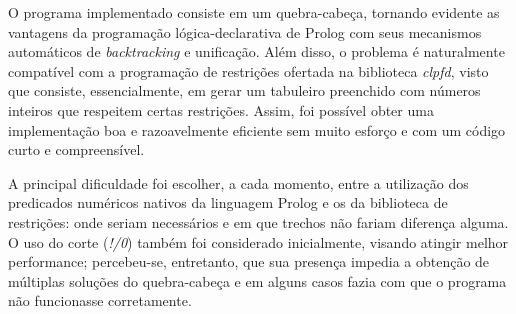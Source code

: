 O programa implementado consiste em um quebra-cabeça, tornando evidente as vantagens da programação lógica-declarativa de Prolog com seus mecanismos automáticos de \textit{backtracking} e unificação.
Além disso, o problema é naturalmente compatível com a programação de restrições ofertada na biblioteca \textit{clpfd}, visto que consiste, essencialmente, em gerar um tabuleiro preenchido com números inteiros que respeitem certas restrições.
Assim, foi possível obter uma implementação boa e razoavelmente eficiente sem muito esforço e com um código curto e compreensível.

A principal dificuldade foi escolher, a cada momento, entre a utilização dos predicados numéricos nativos da linguagem Prolog e os da biblioteca de restrições: onde seriam necessários e em que trechos não fariam diferença alguma.
O uso do corte (\textit{!/0}) também foi considerado inicialmente, visando atingir melhor performance; percebeu-se, entretanto, que sua presença impedia a obtenção de múltiplas soluções do quebra-cabeça e em alguns casos fazia com que o programa não funcionasse corretamente.
